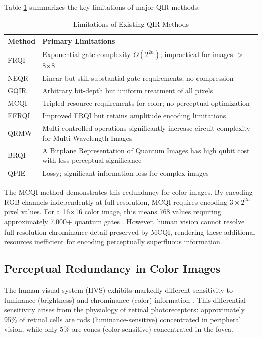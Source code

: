 \documentclass[11pt,a4paper]{article}
\begin{document}
Table \ref{tab:existing_limitations} summarizes the key limitations of major QIR methods:

\begin{table}[H]
\centering
\caption{Limitations of Existing QIR Methods}
\label{tab:existing_limitations}
\begin{tabular}{@{}lp{5.5cm}@{}}
\toprule
\textbf{Method} & \textbf{Primary Limitations} \\
\midrule
FRQI & Exponential gate complexity $O(2^{2n})$; impractical for images $>$ 8×8 \\
NEQR & Linear but still substantial gate requirements; no compression \\
GQIR & Arbitrary bit-depth but uniform treatment of all pixels \\
MCQI & Tripled resource requirements for color; no perceptual optimization \\
EFRQI & Improved FRQI but retains amplitude encoding limitations \\
QRMW & Multi-controlled operations significantly increase circuit complexity for Multi Wavelength Images \\
BRQI & A Bitplane Representation of Quantum Images has high qubit cost with less perceptual significance \\
QPIE & Lossy; significant information loss for complex images \\
\bottomrule
\end{tabular}
\end{table}

The MCQI method demonstrates this redundancy for color images. By encoding RGB channels independently at full resolution, MCQI requires encoding $3 \times 2^{2n}$ pixel values. For a 16×16 color image, this means 768 values requiring approximately 7,000+ quantum gates \cite{ref20}. However, human vision cannot resolve full-resolution chrominance detail preserved by MCQI, rendering these additional resources inefficient for encoding perceptually superfluous information.

\subsection{Perceptual Redundancy in Color Images}

The human visual system (HVS) exhibits markedly different sensitivity to luminance (brightness) and chrominance (color) information \cite{ref7}. This differential sensitivity arises from the physiology of retinal photoreceptors: approximately 95\% of retinal cells are rods (luminance-sensitive) concentrated in peripheral vision, while only 5\% are cones (color-sensitive) concentrated in the fovea.
\end{document}

